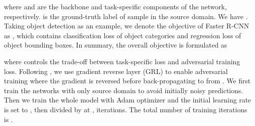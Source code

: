 \documentclass[runningheads]{llncs}
\begin{document}
where  and  are the backbone and task-specific components of the network, respectively.  is the ground-truth label of sample  in the source domain. We have . Taking object detection as an example, we denote the objective of Faster R-CNN as , which contains classification loss of object categories and regression loss of object bounding boxes. In summary, the overall objective is formulated as

where  controls the trade-off between task-specific loss and adversarial training loss. Following \cite{DBLP:conf/cvpr/Chen0SDG18,DBLP:conf/cvpr/SaitoUHS19}, we use gradient reverse layer (GRL) \cite{DBLP:conf/icml/GaninL15} to enable adversarial training where the gradient is reversed before back-propagating to  from . We first train the networks with only source domain to avoid initially noisy predictions. Then we train the whole model with Adam optimizer and the initial learning rate is set to , then divided by  at ,  iterations. The total number of training iterations is .
\end{document}
